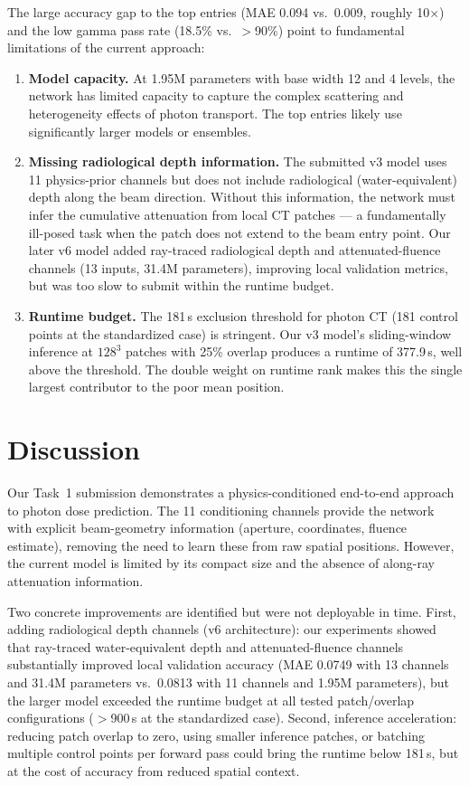\documentclass[runningheads]{llncs}
\begin{document}
The large accuracy gap to the top entries (MAE 0.094 vs.\ 0.009, roughly 10$\times$) and the low gamma pass rate (18.5\% vs.\ $>$90\%) point to fundamental limitations of the current approach:

\begin{enumerate}
\item \textbf{Model capacity.} At 1.95M parameters with base width 12 and 4 levels, the network has limited capacity to capture the complex scattering and heterogeneity effects of photon transport. The top entries likely use significantly larger models or ensembles.

\item \textbf{Missing radiological depth information.} The submitted v3 model uses 11 physics-prior channels but does not include radiological (water-equivalent) depth along the beam direction. Without this information, the network must infer the cumulative attenuation from local CT patches --- a fundamentally ill-posed task when the patch does not extend to the beam entry point. Our later v6 model added ray-traced radiological depth and attenuated-fluence channels (13 inputs, 31.4M parameters), improving local validation metrics, but was too slow to submit within the runtime budget.

\item \textbf{Runtime budget.} The 181\,s exclusion threshold for photon CT (181 control points at the standardized case) is stringent. Our v3 model's sliding-window inference at $128^3$ patches with 25\% overlap produces a runtime of 377.9\,s, well above the threshold. The double weight on runtime rank makes this the single largest contributor to the poor mean position.
\end{enumerate}

\section{Discussion}

Our Task~1 submission demonstrates a physics-conditioned end-to-end approach to photon dose prediction. The 11 conditioning channels provide the network with explicit beam-geometry information (aperture, coordinates, fluence estimate), removing the need to learn these from raw spatial positions. However, the current model is limited by its compact size and the absence of along-ray attenuation information.

Two concrete improvements are identified but were not deployable in time. First, adding radiological depth channels (v6 architecture): our experiments showed that ray-traced water-equivalent depth and attenuated-fluence channels substantially improved local validation accuracy (MAE 0.0749 with 13 channels and 31.4M parameters vs.\ 0.0813 with 11 channels and 1.95M parameters), but the larger model exceeded the runtime budget at all tested patch/overlap configurations ($>$900\,s at the standardized case). Second, inference acceleration: reducing patch overlap to zero, using smaller inference patches, or batching multiple control points per forward pass could bring the runtime below 181\,s, but at the cost of accuracy from reduced spatial context.
\end{document}
